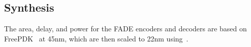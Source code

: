 \subsection{Synthesis}
The area, delay, and power for the FADE encoders and decoders are based on FreePDK~\cite{FreePDK45} at 45nm, which are then scaled to 22nm using~\cite{45nmto22nm1,45nmto22nm2}.

